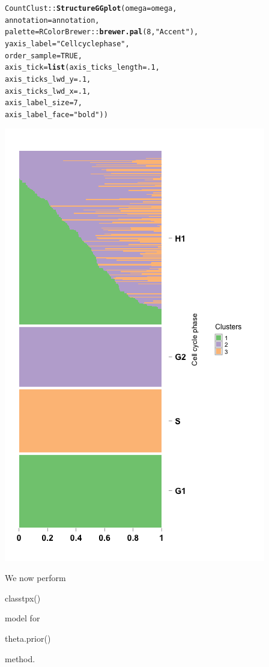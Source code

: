 \documentclass[12pt]{article}\usepackage[]{graphicx}\usepackage[usenames,dvipsnames]{color}
\makeatletter
\newcommand{\hlnum}[1]{\textcolor[rgb]{0.686,0.059,0.569}{#1}}%
\newcommand{\hlstr}[1]{\textcolor[rgb]{0.192,0.494,0.8}{#1}}%
\newcommand{\hlopt}[1]{\textcolor[rgb]{0,0,0}{#1}}%
\newcommand{\hlstd}[1]{\textcolor[rgb]{0.345,0.345,0.345}{#1}}%
\newcommand{\hlkwc}[1]{\textcolor[rgb]{0.333,0.667,0.333}{#1}}%
\newcommand{\hlkwd}[1]{\textcolor[rgb]{0.737,0.353,0.396}{\textbf{#1}}}%
\newenvironment{kframe}{%
 \def\at@end@of@kframe{}%
 \ifinner\ifhmode%
  \def\at@end@of@kframe{\end{minipage}}%
  \begin{minipage}{\columnwidth}%
 \fi\fi%
 \def\FrameCommand##1{\hskip\@totalleftmargin \hskip-\fboxsep
 \colorbox{shadecolor}{##1}\hskip-\fboxsep
     \hskip-\linewidth \hskip-\@totalleftmargin \hskip\columnwidth}%
 \MakeFramed {\advance\hsize-\width
   \@totalleftmargin\z@ \linewidth\hsize
   \@setminipage}}%
 {\par\unskip\endMakeFramed%
 \at@end@of@kframe}
\newenvironment{knitrout}{}{} %
\makeatother
\begin{document}
\begin{knitrout}
\begin{kframe}
\begin{alltt}
\hlstd{CountClust}\hlopt{::}\hlkwd{StructureGGplot}\hlstd{(}\hlkwc{omega} \hlstd{= omega,}
                \hlkwc{annotation} \hlstd{= annotation,}
                \hlkwc{palette} \hlstd{= RColorBrewer}\hlopt{::}\hlkwd{brewer.pal}\hlstd{(}\hlnum{8}\hlstd{,} \hlstr{"Accent"}\hlstd{),}
                \hlkwc{yaxis_label} \hlstd{=} \hlstr{"Cell cycle phase"}\hlstd{,}
                \hlkwc{order_sample} \hlstd{=} \hlnum{TRUE}\hlstd{,}
                \hlkwc{axis_tick} \hlstd{=} \hlkwd{list}\hlstd{(}\hlkwc{axis_ticks_length} \hlstd{=} \hlnum{.1}\hlstd{,}
                                 \hlkwc{axis_ticks_lwd_y} \hlstd{=} \hlnum{.1}\hlstd{,}
                                 \hlkwc{axis_ticks_lwd_x} \hlstd{=} \hlnum{.1}\hlstd{,}
                                 \hlkwc{axis_label_size} \hlstd{=} \hlnum{7}\hlstd{,}
                                 \hlkwc{axis_label_face} \hlstd{=} \hlstr{"bold"}\hlstd{))}
\end{alltt}
\end{kframe}
\includegraphics[width=3 in,height=5 in]{figure/structure_leng_1-1} 

\end{knitrout}

We now perform  \begin{verb} classtpx() \end{verb} model for \begin{verb} theta.prior() \end{verb} method.
\end{document}
